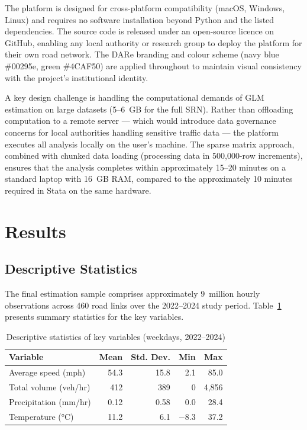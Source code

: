 \documentclass[review]{elsarticle}
\begin{document}
The platform is designed for cross-platform compatibility (macOS, Windows, Linux) and requires no software installation beyond Python and the listed dependencies. The source code is released under an open-source licence on GitHub, enabling any local authority or research group to deploy the platform for their own road network. The DARe branding and colour scheme (navy blue \#00295e, green \#4CAF50) are applied throughout to maintain visual consistency with the project's institutional identity.

A key design challenge is handling the computational demands of GLM estimation on large datasets (5--6~GB for the full SRN). Rather than offloading computation to a remote server --- which would introduce data governance concerns for local authorities handling sensitive traffic data --- the platform executes all analysis locally on the user's machine. The sparse matrix approach, combined with chunked data loading (processing data in 500{,}000-row increments), ensures that the analysis completes within approximately 15--20 minutes on a standard laptop with 16~GB RAM, compared to the approximately 10 minutes required in Stata on the same hardware.


\section{Results}
\label{sec:results}

\subsection{Descriptive Statistics}
\label{sec:results:desc}

The final estimation sample comprises approximately 9~million hourly observations across 460 road links over the 2022--2024 study period. Table~\ref{tab:desc} presents summary statistics for the key variables.

\begin{table}[htbp]
\centering
\caption{Descriptive statistics of key variables (weekdays, 2022--2024)}
\label{tab:desc}
\begin{tabular}{lrrrr}
\toprule
Variable & Mean & Std. Dev. & Min & Max \\
\midrule
Average speed (mph) & 54.3 & 15.8 & 2.1 & 85.0 \\
Total volume (veh/hr) & 412 & 389 & 0 & 4{,}856 \\
Precipitation (mm/hr) & 0.12 & 0.58 & 0.0 & 28.4 \\
Temperature (\si{\degreeCelsius}) & 11.2 & 6.1 & $-$8.3 & 37.2 \\
\bottomrule
\end{tabular}
\end{table}
\end{document}
